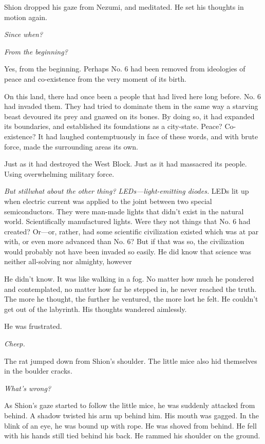 Shion dropped his gaze from Nezumi, and meditated. He set his thoughts
in motion again.

\emph{Since when?}

\emph{From the beginning?}

Yes, from the beginning. Perhaps No. 6 had been removed from ideologies
of peace and co-existence from the very moment of its birth.

On this land, there had once been a people that had lived here long
before. No. 6 had invaded them. They had tried to dominate them in the
same way a starving beast devoured its prey and gnawed on its bones. By
doing so, it had expanded its boundaries, and established its
foundations as a city-state. Peace? Co-existence? It had laughed
contemptuously in face of these words, and with brute force, made the
surrounding areas its own.

Just as it had destroyed the West Block. Just as it had massacred its
people. Using overwhelming military force.

\emph{But still\el what about the other thing? LEDs---light-emitting diodes.}
LEDs lit up when electric current was applied to the joint between two
special semiconductors. They were man-made lights that didn't exist in
the natural world. Scientifically manufactured lights. Were they not
things that No. 6 had created? Or---or, rather, had some scientific
civilization existed which was at par with, or even more advanced than
No. 6? But if that was so, the civilization would probably not have been
invaded so easily. He did know that science was neither all-solving nor
almighty, however\el 

He didn't know. It was like walking in a fog. No matter how much he
pondered and contemplated, no matter how far he stepped in, he never
reached the truth. The more he thought, the further he ventured, the
more lost he felt. He couldn't get out of the labyrinth. His thoughts
wandered aimlessly.

He was frustrated.

\emph{Cheep.}

The rat jumped down from Shion's shoulder. The little mice also hid
themselves in the boulder cracks.

\emph{What's wrong?}

As Shion's gaze started to follow the little mice, he was suddenly
attacked from behind. A shadow twisted his arm up behind him. His mouth
was gagged. In the blink of an eye, he was bound up with rope. He was
shoved from behind. He fell with his hands still tied behind his back.
He rammed his shoulder on the ground.

